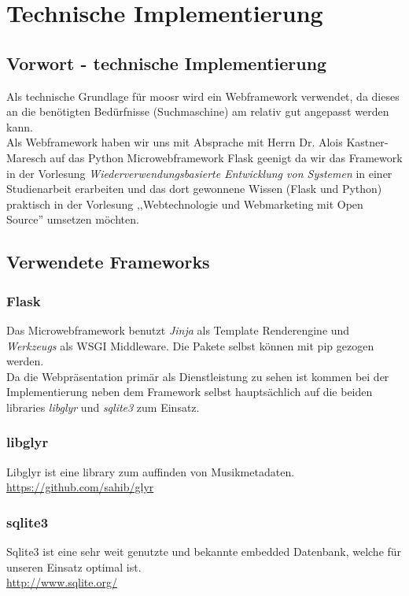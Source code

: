 \chapter{Technische Implementierung}

\section{Vorwort - technische Implementierung}
Als technische Grundlage für moosr wird ein Webframework verwendet, da dieses an
die benötigten Bedürfnisse (Suchmaschine) am relativ gut angepasst werden kann.
\\
Als Webframework haben wir uns mit Absprache mit Herrn Dr. Alois
Kastner-Maresch auf das Python Microwebframework Flask geenigt da wir das
Framework in der Vorlesung \emph{Wiederverwendungsbasierte Entwicklung von
Systemen} in einer Studienarbeit erarbeiten und das dort gewonnene Wissen (Flask
und Python) praktisch in der Vorlesung ,,Webtechnologie und Webmarketing 
mit Open Source'' umsetzen möchten.

\section{Verwendete Frameworks}

\subsection{Flask}
Das Microwebframework benutzt \emph{Jinja} als Template Renderengine und
\emph{Werkzeugs} als WSGI Middleware. Die Pakete selbst können mit pip gezogen
werden.
\\
Da die Webpräsentation primär als Dienstleistung zu sehen ist kommen bei der
Implementierung neben dem Framework selbst hauptsächlich auf die beiden
libraries \emph{libglyr} und \emph{sqlite3} zum Einsatz.

\subsection{libglyr}
Libglyr ist eine library zum auffinden von Musikmetadaten. 
\\
\url{https://github.com/sahib/glyr}

\subsection{sqlite3}
Sqlite3 ist eine sehr weit genutzte und bekannte embedded Datenbank, welche für
unseren Einsatz optimal ist.
\\
\url{http://www.sqlite.org/}


